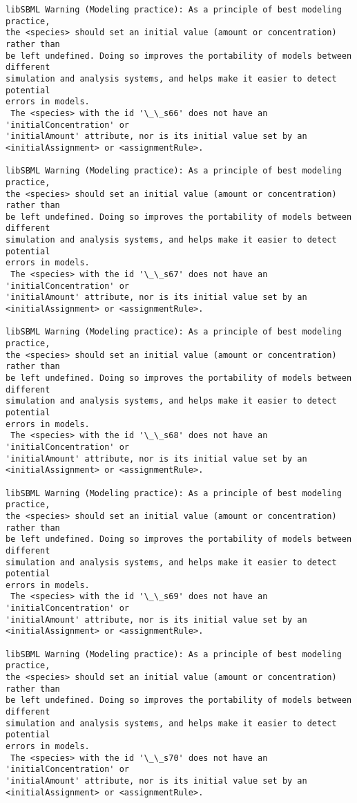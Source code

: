 \documentclass[11pt]{article}
\begin{document}
\begin{Verbatim}[commandchars=\\\{\}]
libSBML Warning (Modeling practice): As a principle of best modeling practice,
the <species> should set an initial value (amount or concentration) rather than
be left undefined. Doing so improves the portability of models between different
simulation and analysis systems, and helps make it easier to detect potential
errors in models.
 The <species> with the id '\_\_s66' does not have an 'initialConcentration' or
'initialAmount' attribute, nor is its initial value set by an
<initialAssignment> or <assignmentRule>.

libSBML Warning (Modeling practice): As a principle of best modeling practice,
the <species> should set an initial value (amount or concentration) rather than
be left undefined. Doing so improves the portability of models between different
simulation and analysis systems, and helps make it easier to detect potential
errors in models.
 The <species> with the id '\_\_s67' does not have an 'initialConcentration' or
'initialAmount' attribute, nor is its initial value set by an
<initialAssignment> or <assignmentRule>.

libSBML Warning (Modeling practice): As a principle of best modeling practice,
the <species> should set an initial value (amount or concentration) rather than
be left undefined. Doing so improves the portability of models between different
simulation and analysis systems, and helps make it easier to detect potential
errors in models.
 The <species> with the id '\_\_s68' does not have an 'initialConcentration' or
'initialAmount' attribute, nor is its initial value set by an
<initialAssignment> or <assignmentRule>.

libSBML Warning (Modeling practice): As a principle of best modeling practice,
the <species> should set an initial value (amount or concentration) rather than
be left undefined. Doing so improves the portability of models between different
simulation and analysis systems, and helps make it easier to detect potential
errors in models.
 The <species> with the id '\_\_s69' does not have an 'initialConcentration' or
'initialAmount' attribute, nor is its initial value set by an
<initialAssignment> or <assignmentRule>.

libSBML Warning (Modeling practice): As a principle of best modeling practice,
the <species> should set an initial value (amount or concentration) rather than
be left undefined. Doing so improves the portability of models between different
simulation and analysis systems, and helps make it easier to detect potential
errors in models.
 The <species> with the id '\_\_s70' does not have an 'initialConcentration' or
'initialAmount' attribute, nor is its initial value set by an
<initialAssignment> or <assignmentRule>.


\end{Verbatim}
\end{document}
